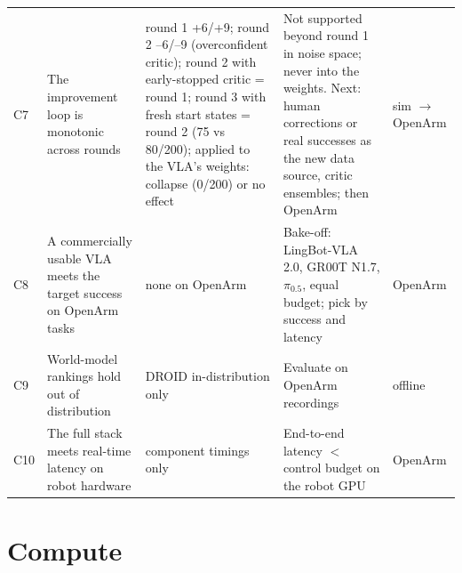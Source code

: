 \documentclass[10pt,a4paper]{article}
\newcommand{\pzf}{$\pi_{0.5}$}
\begin{document}
\begin{small}
\begin{longtable}{@{}P{0.5cm}P{4.3cm}P{3.3cm}P{4.3cm}P{2.4cm}@{}}
C7 & The improvement loop is monotonic across rounds & round 1 +6/+9; round 2 --6/--9 (overconfident critic); round 2 with early-stopped critic = round 1; round 3 with fresh start states = round 2 (75 vs 80/200); applied to the VLA's weights: collapse (0/200) or no effect & Not supported beyond round 1 in noise space; never into the weights. Next: human corrections or real successes as the new data source, critic ensembles; then OpenArm & sim $\rightarrow$ OpenArm \\
C8 & A commercially usable VLA meets the target success on OpenArm tasks & none on OpenArm & Bake-off: LingBot-VLA 2.0, GR00T N1.7, \pzf, equal budget; pick by success and latency & OpenArm \\
C9 & World-model rankings hold out of distribution & DROID in-distribution only & Evaluate on OpenArm recordings & offline \\
C10 & The full stack meets real-time latency on robot hardware & component timings only & End-to-end latency $<$ control budget on the robot GPU & OpenArm \\
\bottomrule
\end{longtable}
\end{small}

\section{Compute}
\label{sec:compute}
\end{document}
